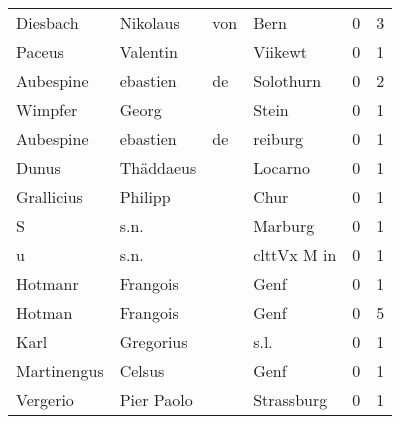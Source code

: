 \begin{tabular}{llllrr}
                 Diesbach &                           Nikolaus &         von &                                        Bern &          0 &         3 \\
                   Paceus &                           Valentin &             &                                     Viikewt &          0 &         1 \\
                Aubespine &                           ebastien &          de &                                   Solothurn &          0 &         2 \\
                  Wimpfer &                              Georg &             &                                       Stein &          0 &         1 \\
                Aubespine &                           ebastien &          de &                                     reiburg &          0 &         1 \\
                    Dunus &                          Thäddaeus &             &                                     Locarno &          0 &         1 \\
               Grallicius &                            Philipp &             &                                        Chur &          0 &         1 \\
                        S &                               s.n. &             &                                     Marburg &          0 &         1 \\
                        u &                               s.n. &             &                                 clttVx M in &          0 &         1 \\
                  Hotmanr &                           Frangois &             &                                        Genf &          0 &         1 \\
                   Hotman &                           Frangois &             &                                        Genf &          0 &         5 \\
                     Karl &                          Gregorius &             &                                        s.l. &          0 &         1 \\
              Martinengus &                             Celsus &             &                                        Genf &          0 &         1 \\
                 Vergerio &                         Pier Paolo &             &                                  Strassburg &          0 &         1 \\

\end{tabular}
